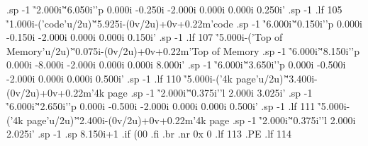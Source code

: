 .sp -1
\h'2.000i'\v'6.050i'\D'p 0.000i -0.250i -2.000i 0.000i 0.000i 0.250i'
.sp -1
.lf 105
\h'1.000i-(\w'code'u/2u)'\v'5.925i-(0v/2u)+0v+0.22m'code
.sp -1
\h'6.000i'\v'0.150i'\D'p 0.000i -0.150i -2.000i 0.000i 0.000i 0.150i'
.sp -1
.lf 107
\h'5.000i-(\w'Top of Memory'u/2u)'\v'0.075i-(0v/2u)+0v+0.22m'Top of Memory
.sp -1
\h'6.000i'\v'8.150i'\D'p 0.000i -8.000i -2.000i 0.000i 0.000i 8.000i'
.sp -1
\h'6.000i'\v'3.650i'\D'p 0.000i -0.500i -2.000i 0.000i 0.000i 0.500i'
.sp -1
.lf 110
\h'5.000i-(\w'4k page'u/2u)'\v'3.400i-(0v/2u)+0v+0.22m'4k page
.sp -1
\h'2.000i'\v'0.375i'\D'l 2.000i 3.025i'
.sp -1
\h'6.000i'\v'2.650i'\D'p 0.000i -0.500i -2.000i 0.000i 0.000i 0.500i'
.sp -1
.lf 111
\h'5.000i-(\w'4k page'u/2u)'\v'2.400i-(0v/2u)+0v+0.22m'4k page
.sp -1
\h'2.000i'\v'0.375i'\D'l 2.000i 2.025i'
.sp -1
.sp 8.150i+1
.if \n(00 .fi
.br
.nr 0x 0
.lf 113
.PE
.lf 114

